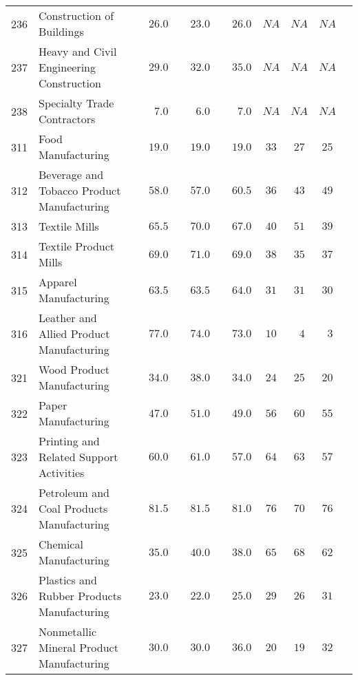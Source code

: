 \documentclass[9pt, oneside]{article}   	%
\begin{document}
\begin{longtable}{lp{3 in}ccccccc}
236  & Construction of Buildings & $\phantom{00}26.0$ & $\phantom{00}23.0$ & $\phantom{00}26.0$ & $NA$ & $NA$ & $NA$ \\
237  & Heavy and Civil Engineering Construction & $\phantom{00}29.0$ & $\phantom{00}32.0$ & $\phantom{00}35.0$ & $NA$ & $NA$ & $NA$ \\
238  & Specialty Trade Contractors & $\phantom{000}7.0$ & $\phantom{000}6.0$ & $\phantom{000}7.0$ & $NA$ & $NA$ & $NA$ \\
311  & Food Manufacturing & $\phantom{00}19.0$ & $\phantom{00}19.0$ & $\phantom{00}19.0$ & $33$ & $27$ & $25$ \\
312  & Beverage and Tobacco Product Manufacturing & $\phantom{00}58.0$ & $\phantom{00}57.0$ & $\phantom{00}60.5$ & $36$ & $43$ & $49$ \\
313  & Textile Mills & $\phantom{00}65.5$ & $\phantom{00}70.0$ & $\phantom{00}67.0$ & $40$ & $51$ & $39$ \\
314  & Textile Product Mills & $\phantom{00}69.0$ & $\phantom{00}71.0$ & $\phantom{00}69.0$ & $38$ & $35$ & $37$ \\
315  & Apparel Manufacturing & $\phantom{00}63.5$ & $\phantom{00}63.5$ & $\phantom{00}64.0$ & $31$ & $31$ & $30$ \\
316  & Leather and Allied Product Manufacturing & $\phantom{00}77.0$ & $\phantom{00}74.0$ & $\phantom{00}73.0$ & $10$ & $\phantom{0}4$ & $\phantom{0}3$ \\
321  & Wood Product Manufacturing & $\phantom{00}34.0$ & $\phantom{00}38.0$ & $\phantom{00}34.0$ & $24$ & $25$ & $20$ \\
322  & Paper Manufacturing & $\phantom{00}47.0$ & $\phantom{00}51.0$ & $\phantom{00}49.0$ & $56$ & $60$ & $55$ \\
323  & Printing and Related Support Activities & $\phantom{00}60.0$ & $\phantom{00}61.0$ & $\phantom{00}57.0$ & $64$ & $63$ & $57$ \\
324  & Petroleum and Coal Products Manufacturing & $\phantom{00}81.5$ & $\phantom{00}81.5$ & $\phantom{00}81.0$ & $76$ & $70$ & $76$ \\
325  & Chemical Manufacturing & $\phantom{00}35.0$ & $\phantom{00}40.0$ & $\phantom{00}38.0$ & $65$ & $68$ & $62$ \\
326  & Plastics and Rubber Products Manufacturing & $\phantom{00}23.0$ & $\phantom{00}22.0$ & $\phantom{00}25.0$ & $29$ & $26$ & $31$ \\
327  & Nonmetallic Mineral Product Manufacturing & $\phantom{00}30.0$ & $\phantom{00}30.0$ & $\phantom{00}36.0$ & $20$ & $19$ & $32$ \\

\end{longtable}
\end{document}
